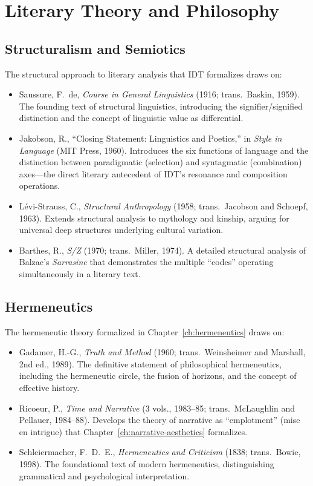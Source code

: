 \documentclass[11pt,openany]{book}
\theoremstyle{definition}
\theoremstyle{plain}
\theoremstyle{remark}
\begin{document}
\section{Literary Theory and Philosophy}

\subsection{Structuralism and Semiotics}

The structural approach to literary analysis that IDT formalizes draws on:

\begin{itemize}
\item Saussure, F.~de, \textit{Course in General Linguistics} (1916; trans.~Baskin, 1959). The founding text of structural linguistics, introducing the signifier/signified distinction and the concept of linguistic value as differential.
\item Jakobson, R., ``Closing Statement: Linguistics and Poetics,'' in \textit{Style in Language} (MIT Press, 1960). Introduces the six functions of language and the distinction between paradigmatic (selection) and syntagmatic (combination) axes---the direct literary antecedent of IDT's resonance and composition operations.
\item L\'evi-Strauss, C., \textit{Structural Anthropology} (1958; trans.~Jacobson and Schoepf, 1963). Extends structural analysis to mythology and kinship, arguing for universal deep structures underlying cultural variation.
\item Barthes, R., \textit{S/Z} (1970; trans.~Miller, 1974). A detailed structural analysis of Balzac's \emph{Sarrasine} that demonstrates the multiple ``codes'' operating simultaneously in a literary text.
\end{itemize}

\subsection{Hermeneutics}

The hermeneutic theory formalized in Chapter~\ref{ch:hermeneutics} draws on:

\begin{itemize}
\item Gadamer, H.-G., \textit{Truth and Method} (1960; trans.~Weinsheimer and Marshall, 2nd ed., 1989). The definitive statement of philosophical hermeneutics, including the hermeneutic circle, the fusion of horizons, and the concept of effective history.
\item Ricoeur, P., \textit{Time and Narrative} (3 vols., 1983--85; trans.~McLaughlin and Pellauer, 1984--88). Develops the theory of narrative as ``emplotment'' (mise en intrigue) that Chapter~\ref{ch:narrative-aesthetics} formalizes.
\item Schleiermacher, F.~D.~E., \textit{Hermeneutics and Criticism} (1838; trans.~Bowie, 1998). The foundational text of modern hermeneutics, distinguishing grammatical and psychological interpretation.
\end{itemize}
\end{document}
